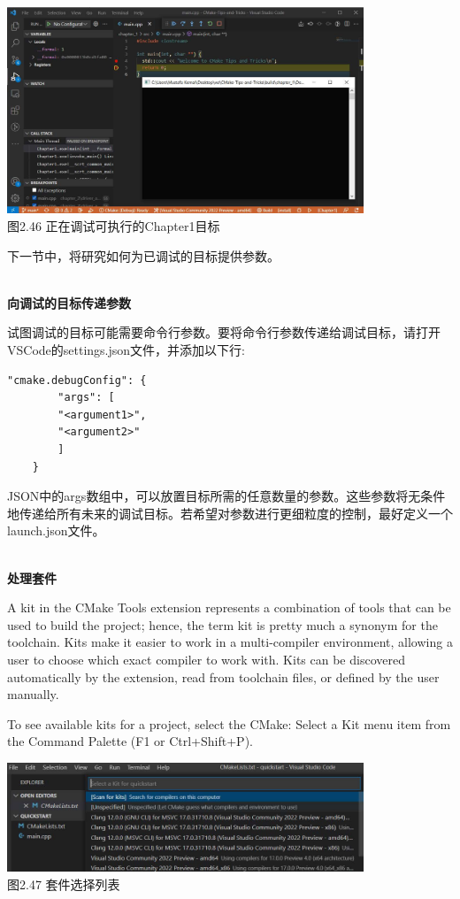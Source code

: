 \begin{center}
\includegraphics[width=0.8\textwidth]{content/1/chapter2/images/46.jpg}\\
图2.46 正在调试可执行的Chapter1目标
\end{center}

下一节中，将研究如何为已调试的目标提供参数。

\hspace*{\fill} \\ %
\noindent
\textbf{向调试的目标传递参数}

试图调试的目标可能需要命令行参数。要将命令行参数传递给调试目标，请打开VSCode的settings.json文件，并添加以下行:

\begin{lstlisting}[style=styleCMake]
"cmake.debugConfig": {
		"args": [
		"<argument1>",
		"<argument2>"
		]
	}
\end{lstlisting}

JSON中的args数组中，可以放置目标所需的任意数量的参数。这些参数将无条件地传递给所有未来的调试目标。若希望对参数进行更细粒度的控制，最好定义一个launch.json文件。

\hspace*{\fill} \\ %
\noindent
\textbf{处理套件}

A kit in the CMake Tools extension represents a combination of tools that can be used to build the project; hence, the term kit is pretty much a synonym for the toolchain. Kits make it easier to work in a multi-compiler environment, allowing a user to choose which exact compiler to work with. Kits can be discovered automatically by the extension, read from toolchain files, or defined by the user manually.

To see available kits for a project, select the CMake: Select a Kit menu item from the Command Palette (F1 or Ctrl+Shift+P).

\begin{center}
\includegraphics[width=0.8\textwidth]{content/1/chapter2/images/47.jpg}\\
图2.47 套件选择列表
\end{center}


